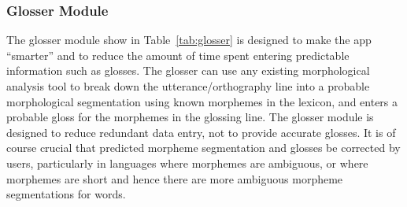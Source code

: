 \documentclass[12 pt]{article}
\begin{document}
\subsubsection{Glosser Module}
The glosser module show in Table~\ref{tab:glosser} is designed to make the app ``smarter'' and to reduce the amount of time spent entering predictable information such as glosses. The glosser can use any existing morphological analysis tool to break down the utterance/orthography line  into a probable morphological segmentation using known morphemes in the lexicon, and enters a probable gloss for the morphemes in the glossing line. The glosser module is designed to reduce redundant data entry, not to provide accurate glosses. It is of course crucial that predicted morpheme segmentation and glosses be corrected by users, particularly in languages where morphemes are ambiguous, or where morphemes are short and hence there are more ambiguous morpheme segmentations for words. 
\end{document}
